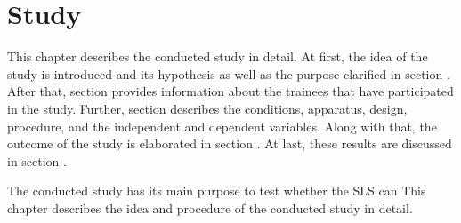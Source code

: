 \chapter{Study}\label{6_study}
This chapter describes the conducted study in detail. 
At first, the idea of the study is introduced and its hypothesis as well as the purpose clarified in section \textit{}.
After that, section \textit{} provides information about the trainees that have participated in the study.
Further, section \textit{} describes the conditions, apparatus, design, procedure, and the independent and dependent variables.
Along with that, the outcome of the study is elaborated in section \textit{}.
At last, these results are discussed in section \textit{}.
\begin{comment}
This chapter describes the idea and procedure of the conducted study in detail.
At first, the introduction and goals are clarified.
After that, information about the participants is given.
In the following, the structure of the study is described, which includes the different conditions, apparatus, design, procedure, and the independent and dependent variables.
Along with that, the results are analysed and their outcome discussed.
\end{comment}
The conducted study has its main purpose to test whether the SLS can 
This chapter describes the idea and procedure of the conducted study in detail.






